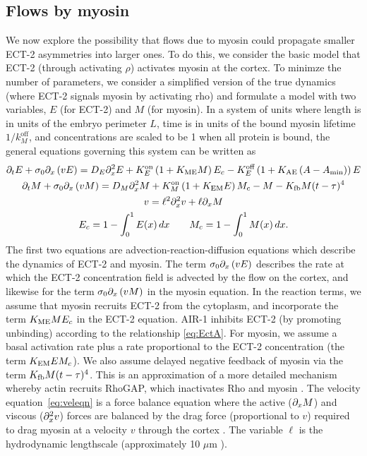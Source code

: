 \documentclass[11pt]{article}
\begin{document}
\subsection{Flows by myosin}
We now explore the possibility that flows due to myosin could propagate smaller ECT-2 asymmetries into larger ones. To do this, we consider the basic model that ECT-2 (through activating $\rho$) activates myosin at the cortex. To minimze the number of parameters, we consider a simplified version of the true dynamics (where ECT-2 signals myosin by activating rho) and formulate a model with two variables, $E$ (for ECT-2) and $M$ (for myosin). In a system of units where length is in units of the embryo perimeter $L$, time is in units of the bound myosin lifetime $1/k^\text{off}_M$, and concentrations are scaled to be 1 when all protein is bound, the general equations governing this system can be written as
\begin{subequations}
\label{eq:MySimple}
\begin{gather}
\partial_t E + \sigma_0 \partial_x \left( v E\right) = D_E \partial_x^2 E +K^\text{on}_E \left(1+K_\text{ME} M\right)E_c - K^\text{off}_E  \left(1+K_\text{AE} \left(A-A_\text{min}\right)\right)E \\
\partial_t M + \sigma_0 \partial_x \left( v M \right) = D_M \partial_x^2 M + K^\text{on}_M \left(1+K_\text{EM} E \right) M_c - M - K_\text{fb} M(t-\tau)^4 \\
\label{eq:veleqn}
v = \ell^2 \partial_x^2 v +\ell \partial_x M \\
E_c = 1-\int_0^1 E(x) \, dx \qquad M_c = 1-\int_0^1 M(x) \, dx.
\end{gather} 
\end{subequations}
The first two equations are advection-reaction-diffusion equations which describe the dynamics of ECT-2 and myosin. The term $\sigma_0 \partial_x \left(v E\right)$ describes the rate at which the ECT-2 concentration field is advected by the flow on the cortex, and likewise for the term $\sigma_0 \partial_x \left(v M\right)$ in the myosin equation. In the reaction terms, we assume that myosin recruits ECT-2 from the cytoplasm, and incorporate the term $K_\text{ME} M E_c$ in the ECT-2 equation. AIR-1 inhibits ECT-2 (by promoting unbinding) according to the relationship \eqref{eq:EctA}. For myosin, we assume a basal activation rate plus a rate proportional to the ECT-2 concentration (the term $K_\text{EM} E M_c$). We also assume delayed negative feedback of myosin via the term $K_\text{fb} M(t-\tau)^4$. This is an approximation of a more detailed mechanism whereby actin recruits RhoGAP, which inactivates Rho and myosin \cite{michaux2018excitable}. The velocity equation\ \eqref{eq:veleqn} is a force balance equation where the active ($\partial_x M$) and viscous ($\partial_x^2 v$) forces are balanced by the drag force (proportional to $v$) required to drag myosin at a velocity $v$ through the cortex \cite{bois2011pattern}. The variable $\ell$ is the hydrodynamic lengthscale (approximately 10 $\mu$m \cite{mayer2010anisotropies}). 
\end{document}
